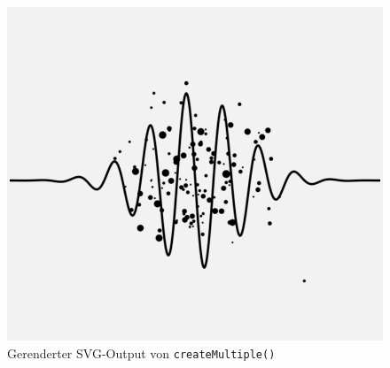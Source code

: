 \documentclass[german,notitlepage,smartquotes]{hgbreport}
\begin{document}
\begin{figure}
\centering
\includegraphics[width=.7\textwidth]{test-05}
\caption{Gerenderter SVG-Output von \texttt{createMultiple()}}
\label{fig:test-05}
\end{figure}






\end{document}
